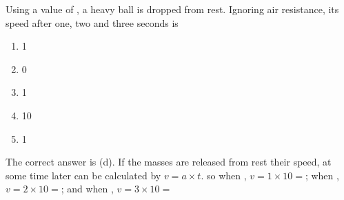 
\begin{problem}[Robin4]
{Using a value of , a heavy ball is dropped from rest. Ignoring air resistance, its speed after one, two and three seconds is
\begin{enumerate}
	\item 1   
	\item 0   
	\item 1   
	\item 10    \answer
	\item 1   
\end{enumerate}
}
{}
{The correct answer is (d).    If the masses are released from rest their speed,  at some time  later can be calculated by $v=a\times t$.   so when ,  $v=1\times 10 =$; when ,  $v=2\times 10 =$; and when ,  $v=3\times 10 =$ }
\end{problem}